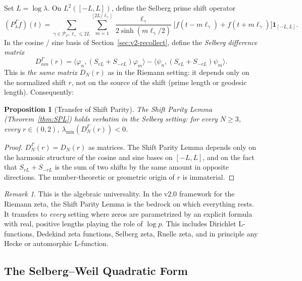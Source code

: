 \documentclass[12pt,a4paper]{article}
\newtheorem{proposition}[theorem]{Proposition}
\theoremstyle{definition}
\theoremstyle{remark}
\newtheorem{remark}[theorem]{Remark}
\begin{document}
Set $L = \log\lambda$. On $L^2([-L, L])$, define the Selberg prime shift operator
\begin{equation}
\label{eq:PSel}
(P^\Gamma_\lambda f)(t) = \sum_{\gamma \in \mathcal{P}_\Gamma, \ell_\gamma \le 2L}\sum_{m=1}^{\lfloor 2L/\ell_\gamma\rfloor}
\frac{\ell_\gamma}{2\sinh(m\ell_\gamma/2)}\bigl[f(t-m\ell_\gamma) + f(t+m\ell_\gamma)\bigr]\mathbf{1}_{[-L,L]}.
\end{equation}
In the cosine / sine basis of Section~\ref{sec:v2-recollect}, define the
\emph{Selberg difference matrix}
\begin{equation}
\label{eq:DNSel}
D^\Gamma_{nm}(r) = \langle\varphi_n, (S_{rL}+S_{-rL})\varphi_m\rangle - \langle\psi_n, (S_{rL}+S_{-rL})\psi_m\rangle.
\end{equation}
This is \emph{the same matrix} $D_N(r)$ as in the Riemann setting: it depends
only on the normalized shift $r$, not on the source of the shift (prime length
or geodesic length). Consequently:

\begin{proposition}[Transfer of Shift Parity]
\label{prop:SPL-transfer}
The Shift Parity Lemma (Theorem~\ref{thm:SPL}) holds verbatim in the Selberg
setting: for every $N \ge 3$, every $r \in (0,2)$,
$\lambda_{\min}(D^\Gamma_N(r)) < 0$.
\end{proposition}

\begin{proof}
$D^\Gamma_N(r) = D_N(r)$ as matrices. The Shift Parity Lemma depends only on
the harmonic structure of the cosine and sine bases on $[-L, L]$, and on the
fact that $S_{rL}+S_{-rL}$ is the sum of two shifts by the same amount in
opposite directions. The number-theoretic or geometric origin of $r$ is
immaterial.
\end{proof}

\begin{remark}
This is the algebraic universality. In the v2.0 framework for the Riemann
zeta, the Shift Parity Lemma is the bedrock on which everything rests. It
transfers to \emph{every} setting where zeros are parametrized by an explicit
formula with real, positive lengths playing the role of $\log p$. This
includes Dirichlet L-functions, Dedekind zeta functions, Selberg zeta,
Ruelle zeta, and in principle any Hecke or automorphic L-function.
\end{remark}

\subsection{\texorpdfstring{The Selberg--Weil Quadratic Form}{The Selberg-Weil Quadratic Form}}
\end{document}
